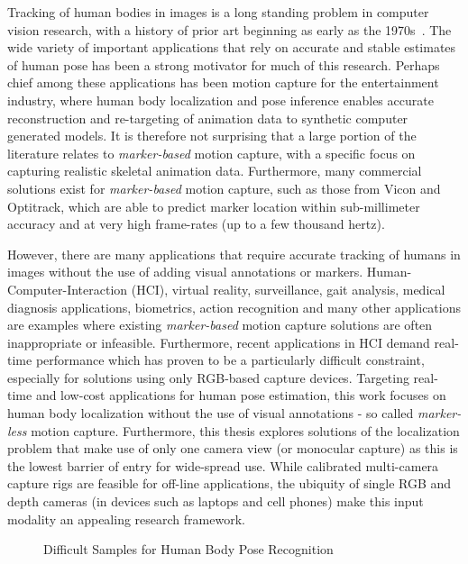 Tracking of human bodies in images is a long standing problem in computer
vision research, with a history of prior art beginning as early as the
1970s~\cite{Fischler73, hogg1983model}. The wide variety of important
applications that rely on accurate and stable estimates of human pose has been
a strong motivator for much of this research. Perhaps chief among these
applications has been motion capture for the entertainment industry, where
human body localization and pose inference enables accurate reconstruction and
re-targeting of animation data to synthetic computer generated models. It is
therefore not surprising that a large portion of the literature relates to
\emph{marker-based} motion capture, with a specific focus on capturing
realistic skeletal animation data. Furthermore, many commercial solutions exist
for \emph{marker-based} motion capture, such as those from Vicon and Optitrack,
which are able to predict marker location within sub-millimeter accuracy and at
very high frame-rates (up to a few thousand hertz).

However, there are many applications that require accurate tracking of humans
in images without the use of adding visual annotations or markers.
Human-Computer-Interaction (HCI), virtual reality, surveillance, gait analysis,
medical diagnosis applications, biometrics, action recognition and many other
applications are examples where existing \emph{marker-based} motion capture
solutions are often inappropriate or infeasible. Furthermore, recent
applications in HCI demand real-time performance which has proven to be a
particularly difficult constraint, especially for solutions using only
RGB-based capture devices. Targeting real-time and low-cost applications for
human pose estimation, this work focuses on human body localization without the
use of visual annotations - so called \emph{marker-less} motion capture.
Furthermore, this thesis explores solutions of the localization problem that
make use of only one camera view (or monocular capture) as this is the lowest
barrier of entry for wide-spread use. While calibrated multi-camera capture
rigs are feasible for off-line applications, the ubiquity of single RGB and
depth cameras (in devices such as laptops and cell phones) make this input
modality an appealing research framework.

\begin{figure}[ht]
\centering
        \caption{Difficult Samples for Human Body Pose Recognition}
        \label{fig:difficult}
\end{figure}

